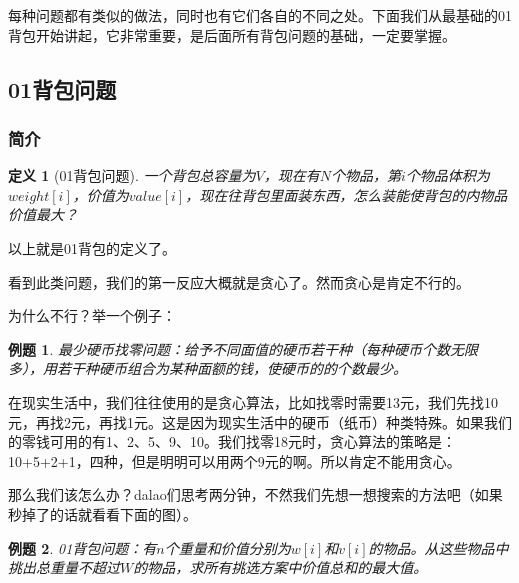 \documentclass{article}
\newtheorem{example}{例题}[subsection]
\newtheorem{definition}{定义}[subsection]
\theoremstyle{nonumberplain}
\begin{document}
每种问题都有类似的做法，同时也有它们各自的不同之处。下面我们从最基础的01背包开始讲起，它非常重要，是后面所有背包问题的基础，一定要掌握。

\subsection{01背包问题}
\subsubsection{简介}
\begin{definition}[01背包问题]一个背包总容量为$V$，现在有$N$个物品，第$i$个物品体积为$weight[i]$，价值为$value[i]$，现在往背包里面装东西，怎么装能使背包的内物品价值最大？\end{definition}

以上就是\rm{01}背包的定义了。

看到此类问题，我们的第一反应大概就是贪心了。然而贪心是肯定不行的。

为什么不行？举一个例子：
\begin{example}最少硬币找零问题：给予不同面值的硬币若干种（每种硬币个数无限多），用若干种硬币组合为某种面额的钱，使硬币的的个数最少。\end{example}

在现实生活中，我们往往使用的是贪心算法，比如找零时需要13元，我们先找10元，再找2元，再找1元。这是因为现实生活中的硬币（纸币）种类特殊。如果我们的零钱可用的有1、2、5、9、10。我们找零18元时，贪心算法的策略是：10+5+2+1，四种，但是明明可以用两个9元的啊。所以肯定不能用贪心。

那么我们该怎么办？dalao们思考两分钟，不然我们先想一想搜索的方法吧（如果秒掉了的话就看看下面的图）。


\newpage
\begin{example}\rm{01}背包问题：有$n$个重量和价值分别为$w[i]$和$v[i]$的物品。从这些物品中挑出总重量不超过$W$的物品，求所有挑选方案中价值总和的最大值。\end{example}
\end{document}
